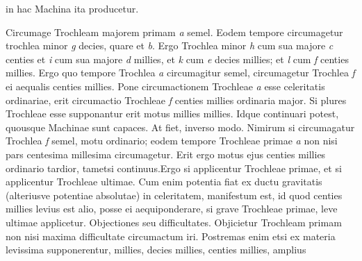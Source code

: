             \begin{center} in hac Machina ita producetur.\end{center}\pend \vspace{1.0ex} \pstart  Circumage Trochleam\protect{} majorem primam \textit{a} semel. Eodem tempore circumagetur trochlea\protect{} minor \textit{g} decies, quare et  \textit{b}. Ergo Trochlea\protect{} minor \textit{h} cum sua majore \textit{c} centies et \textit{i} cum sua majore \textit{d} millies, et \textit{k} cum \textit{e} decies millies; et \textit{l} cum \textit{f} centies millies. Ergo quo tempore Trochlea\protect{} \textit{a} circumagitur semel, circumagetur Trochlea\protect{} \textit{f} ei aequalis centies millies. Pone circumactionem Trochleae\protect{} \textit{a} esse celeritatis ordinariae, erit circumactio Trochleae\protect{} \textit{f} centies millies ordinaria major. Si plures Trochleae\protect{} esse supponantur erit motus millies millies. Idque continuari potest, quousque Machinae sunt capaces. \pend \pstart  At  fiet, inverso modo. Nimirum si circumagatur Trochlea\protect{}  \textit{f} semel, motu ordinario; eodem tempore Trochleae\protect{} primae \textit{a} non nisi pars centesima millesima circumagetur. Erit ergo motus ejus centies millies ordinario tardior, tametsi continuus.\pend \pstart Ergo  si applicentur Trochleae\protect{} primae, et  si applicentur Trochleae\protect{} ultimae. Cum enim potentia fiat ex ductu gravitatis\protect{} (alteriusve potentiae absolutae) in celeritatem, manifestum est, id quod centies millies levius est alio, posse ei aequiponderare, si grave Trochleae\protect{} primae, leve ultimae applicetur. \pend \vspace{2.0ex} \pstart \centering Objectiones seu difficultates.\pend \vspace{1.0ex} \pstart Objicietur Trochleam\protect{} primam non nisi maxima difficultate circumactum iri. Postremas enim etsi ex materia levissima supponerentur, millies, decies millies, centies millies, amplius 